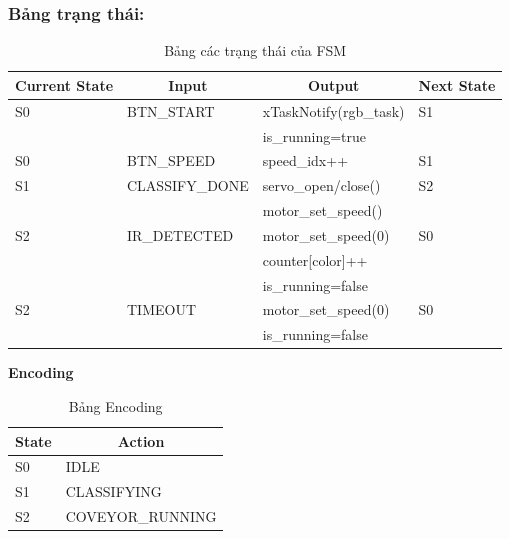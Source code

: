 \subsubsection*{Bảng trạng thái:}
\begin{table}[htbp]
    \centering
    
    \begin{tabular}{|l|l|l|l|}
        \hline
        \textbf{Current State} & \multicolumn{1}{c|}{\textbf{Input}} & \multicolumn{1}{c|}{\textbf{Output}} & \textbf{Next State} \\ \hline
        S0 & BTN\_START & xTaskNotify(rgb\_task) & S1 \\ 
           &            & is\_running=true       &    \\ \hline
        S0 & BTN\_SPEED & speed\_idx++           & S1 \\ \hline
        S1 & CLASSIFY\_DONE & servo\_open/close() & S2 \\ 
           &                & motor\_set\_speed() &    \\ \hline
        S2 & IR\_DETECTED   & motor\_set\_speed(0) & S0 \\ 
           &                & counter[color]++    &    \\ 
           &                & is\_running=false    &    \\ \hline
        S2 & TIMEOUT        & motor\_set\_speed(0) & S0 \\ 
           &                & is\_running=false    &    \\ \hline
    \end{tabular}
    \vspace{0.3cm}
    \caption{Bảng các trạng thái của FSM}
\end{table}
\newpage
\noindent \textbf{Encoding} %

\begin{table}[htbp]
    \centering
    \begin{tabular}{|p{4cm}|p{6cm}|}
        \hline
        \multicolumn{1}{|c|}{\textbf{State}} & \multicolumn{1}{c|}{\textbf{Action}} \\ \hline
        S0 & IDLE \\ \hline
        S1 & CLASSIFYING \\ \hline
        S2 & COVEYOR\_RUNNING \\ \hline
    \end{tabular}
    \vspace{0.3cm} %
    \caption{Bảng Encoding} %
\end{table}


